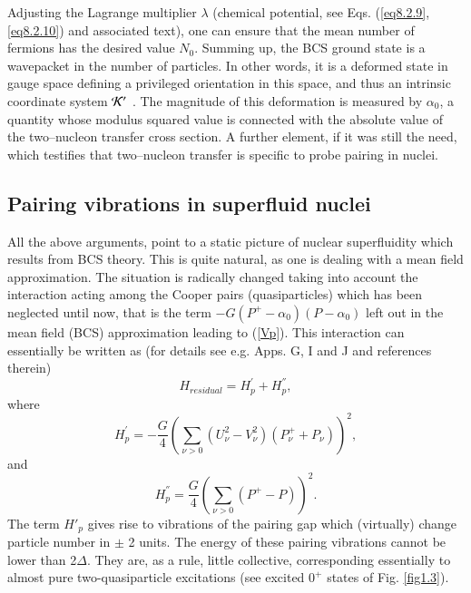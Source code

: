 Adjusting the Lagrange multiplier $\lambda$ (chemical potential, see Eqs. (\ref{eq8.2.9}, \ref{eq8.2.10}) and associated text), one can ensure that the mean number of fermions has the desired value $N_0$.
Summing up, the BCS ground state is a wavepacket in the number of particles. In other words, it is a deformed state in gauge space  defining a privileged 
orientation in this space, and thus an intrinsic coordinate system ${\cal K'}$ \citep{Anderson:58, Bohr:64,Bes:66}.
The magnitude of this deformation is measured by $\alpha_0$, a quantity whose modulus squared value is connected with the absolute value of the two--nucleon transfer cross section. A further element, if it was still the need, which testifies that two--nucleon transfer is specific to probe pairing in nuclei.
\subsection{Pairing vibrations in superfluid nuclei}\label{C8S2.3}
All the above arguments, point to a static picture of nuclear superfluidity which results from BCS theory. This is quite 
natural, as one is dealing with a mean field approximation.
The situation is radically changed  taking into account the interaction 
acting among the Cooper pairs (quasiparticles) which has been neglected until now, that is the term
$- G (P^+ -\alpha_0)(P-\alpha_0)$ left out in the mean field (BCS) approximation leading to (\ref{Vp}).
This interaction can essentially be written as (for details see e.g. \cite{Brink:05} Apps. G, I and J and references therein)
\begin{equation}
H_{residual} = H^{'}_p + H^{''}_p,
\end{equation} 
where 
\begin{equation}
H^{'}_p = - \frac{G}{4} 
\left( \sum_{\nu>0} (U^2_{\nu} - V^2_{\nu})(P^+_{\nu} + P_{\nu}) \right)^2,
\end{equation}
and 
\begin{equation}
H_p^{''} = \frac{G}{4} \left( \sum_{\nu>0} (P^+ - P) \right)^2.
\end{equation}
The term $H'_p$ gives rise to vibrations of the pairing gap  which (virtually) change particle number in $\pm$ 2 units. The energy
of these pairing vibrations cannot be lower than 2$\Delta$. They are, as a rule, little collective, corresponding  essentially 
to almost pure two-quasiparticle excitations (see excited $0^+$ states of Fig. \ref{fig1.3}).

